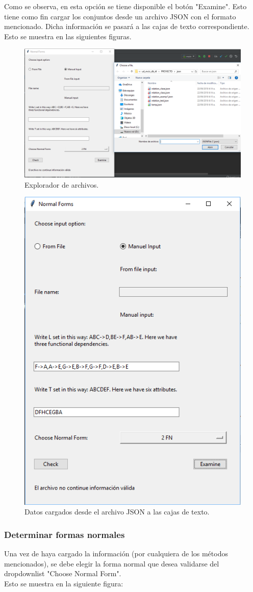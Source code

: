 \documentclass[a4paper,12pt]{article}
\begin{document}
{Como se observa, en esta opción se tiene disponible el botón "Examine". Esto tiene como fin cargar los conjuntos desde un archivo JSON con el formato mencionado. Dicha información se pasará a las cajas de texto correspondiente.
\\
Esto se muestra en las siguientes figuras.

\begin{figure}[H]
\centering
  \includegraphics[width=0.75\linewidth]{Images/examine_manual.png}
  \caption{Explorador de archivos.}
  \label{fig:neurona1}
\end{figure}

\begin{figure}[H]
\centering
  \includegraphics[width=0.3\linewidth]{Images/data_from_file.png}
  \caption{Datos cargados desde el archivo JSON a las cajas de texto.}
  \label{fig:neurona1}
\end{figure}



\subsubsection{Determinar formas normales}
Una vez de haya cargado la información (por cualquiera de los métodos mencionados), se debe elegir la forma normal que desea validarse del dropdownlist "Choose Normal Form".
\\
Esto se muestra en la siguiente figura:

}
\end{document}

